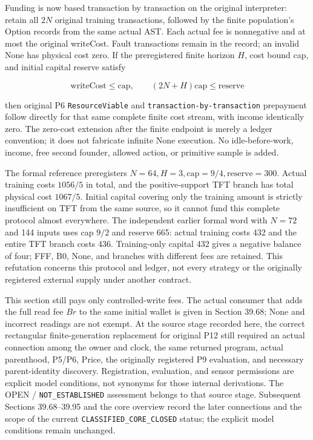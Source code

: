 \documentclass[
  english,
  11pt,
  oneside]{book}
\begin{document}
Funding is now based transaction by transaction on the original interpreter: retain all \(2N\) original training transactions, followed by the finite population's Option records from the same actual AST. Each actual fee is nonnegative and at most the original writeCost. Fault transactions remain in the record; an invalid None has physical cost zero. If the preregistered finite horizon \(H\), cost bound cap, and initial capital reserve satisfy

\[\text{writeCost}\le\mathrm{cap},\qquad
(2N+H)\mathrm{cap}\le\mathrm{reserve}\]

then original P6 \nolinkurl{ResourceViable} and \nolinkurl{transaction-by-transaction} prepayment follow directly for that same complete finite cost stream, with income identically zero. The zero-cost extension after the finite endpoint is merely a ledger convention; it does not fabricate infinite None execution. No idle-before-work, income, free second founder, allowed action, or primitive sample is added.

The formal reference preregisters \(N=64,H=3,\mathrm{cap}=9/4,\mathrm{reserve}=300\). Actual training costs \(1056/5\) in total, and the positive-support TFT branch has total physical cost \(1067/5\). Initial capital covering only the training amount is strictly insufficient on TFT from the same source, so it cannot fund this complete protocol almost everywhere. The independent earlier formal word with \(N=72\) and 144 inputs uses cap \(9/2\) and reserve 665: actual training costs 432 and the entire TFT branch costs 436. Training-only capital 432 gives a negative balance of four; FFF, B0, None, and branches with different fees are retained. This refutation concerns this protocol and ledger, not every strategy or the originally registered external supply under another contract.

This section still pays only controlled-write fees. The actual consumer that adds the full read fee \(B r\) to the same initial wallet is given in Section 39.68; None and incorrect readings are not exempt. At the source stage recorded here, the correct rectangular finite-generation replacement for original P12 still required an actual connection among the owner and clock, the same returned program, actual parenthood, P5/P6, Price, the originally registered P9 evaluation, and necessary parent-identity discovery. Registration, evaluation, and sensor permissions are explicit model conditions, not synonyms for those internal derivations. The OPEN / \nolinkurl{NOT_ESTABLISHED} assessment belongs to that source stage. Subsequent Sections 39.68--39.95 and the core overview record the later connections and the scope of the current \nolinkurl{CLASSIFIED_CORE_CLOSED} status; the explicit model conditions remain unchanged.
\end{document}
